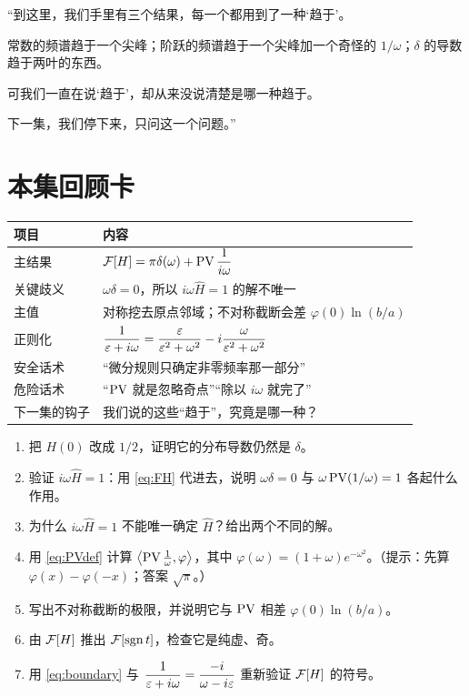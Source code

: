 \begin{scriptbox}[最后 30 秒的旁白骨架]
“到这里，我们手里有三个结果，每一个都用到了一种‘趋于’。

常数的频谱趋于一个尖峰；阶跃的频谱趋于一个尖峰加一个奇怪的 $1/\omega$；$\delta$ 的导数趋于两叶的东西。

可我们一直在说‘趋于’，却从来没说清楚是哪一种趋于。

下一集，我们停下来，只问这一个问题。”
\end{scriptbox}


\section{本集回顾卡}

\begin{center}
\small
\renewcommand{\arraystretch}{1.4}
\begin{tabularx}{\textwidth}{@{}L{3.4cm}Y@{}}
\toprule
项目 & 内容 \\
\midrule
主结果 & $\mathcal{F}[H]=\pi\delta(\omega)+\operatorname{PV}\dfrac{1}{i\omega}$ \\
关键歧义 & $\omega\delta=0$，所以 $i\omega\widehat H=1$ 的解不唯一 \\
主值 & 对称挖去原点邻域；不对称截断会差 $\varphi(0)\ln(b/a)$ \\
正则化 & $\dfrac{1}{\varepsilon+i\omega}=\dfrac{\varepsilon}{\varepsilon^{2}+\omega^{2}}-i\dfrac{\omega}{\varepsilon^{2}+\omega^{2}}$ \\
安全话术 & “微分规则只确定非零频率那一部分” \\
危险话术 & “$\operatorname{PV}$ 就是忽略奇点”“除以 $i\omega$ 就完了” \\
下一集的钩子 & 我们说的这些“趋于”，究竟是哪一种？ \\
\bottomrule
\end{tabularx}
\end{center}

\begin{quizbox}[EP03 自测]
\begin{enumerate}[leftmargin=1.6em,itemsep=0.35em]
\item 把 $H(0)$ 改成 $1/2$，证明它的分布导数仍然是 $\delta$。
\item 验证 $i\omega\widehat H=1$：用 \eqref{eq:FH} 代进去，说明 $\omega\delta=0$ 与 $\omega\operatorname{PV}(1/\omega)=1$ 各起什么作用。
\item 为什么 $i\omega\widehat H=1$ 不能唯一确定 $\widehat H$？给出两个不同的解。
\item 用 \eqref{eq:PVdef} 计算 $\left\langle\operatorname{PV}\frac1\omega,\varphi\right\rangle$，其中 $\varphi(\omega)=(1+\omega)e^{-\omega^{2}}$。（提示：先算 $\varphi(x)-\varphi(-x)$；答案 $\sqrt{\pi}$。）
\item 写出不对称截断的极限，并说明它与 $\operatorname{PV}$ 相差 $\varphi(0)\ln(b/a)$。
\item 由 $\mathcal{F}[H]$ 推出 $\mathcal{F}[\operatorname{sgn} t]$，检查它是纯虚、奇。
\item 用 \eqref{eq:boundary} 与 $\dfrac{1}{\varepsilon+i\omega}=\dfrac{-i}{\omega-i\varepsilon}$ 重新验证 $\mathcal{F}[H]$ 的符号。
\end{enumerate}
\end{quizbox}
